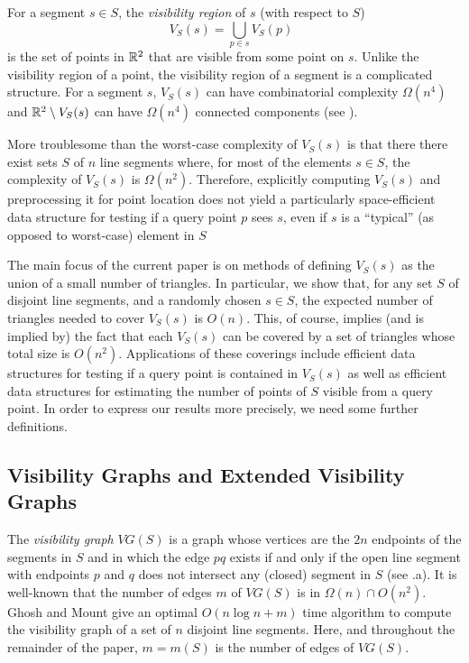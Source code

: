 \documentclass{patmorin}
\newcommand{\VG}{\mathit{VG}}
\begin{document}
For a segment $s\in S$, the \emph{visibility region} of $s$ (with respect
to $S$)
\[
   V_S(s)=\bigcup_{p\in s} V_S(p) \enspace 
\]
is the set of points in $\mathbb{R}^2$ that are visible from some point on $s$.
Unlike the visibility region of a point, the visibility region of a
segment is a complicated structure.  For a segment $s$, $V_S(s)$ can have
combinatorial complexity $\Omega(n^4)$ and $\mathbb{R}^2\setminus V_S(s)$ can
have $\Omega(n^4)$ connected components \cite{oXX} (see ).

More troublesome than the worst-case complexity of $V_S(s)$ is that
there there exist sets $S$ of $n$ line segments where, for most of
the elements $s\in S$, the complexity of $V_S(s)$ is $\Omega(n^2)$.
Therefore, explicitly computing $V_S(s)$ and preprocessing it for point
location does not yield a particularly space-efficient data structure
for testing if a query point $p$ sees $s$, even if $s$ is a ``typical''
(as opposed to worst-case) element in $S$

The main focus of the current paper is on methods of defining $V_S(s)$ as
the union of a small number of triangles.  In particular, we show that,
for any set $S$ of disjoint line segments, and a randomly chosen $s\in
S$, the expected number of triangles needed to cover $V_S(s)$ is $O(n)$.
This, of course, implies (and is implied by) the fact that each $V_S(s)$
can be covered by a set of triangles whose total size is $O(n^2)$.
Applications of these coverings include efficient data structures for
testing if a query point is contained in $V_S(s)$ as well as efficient
data structures for estimating the number of points of $S$ visible from
a query point.  In order to express our results more precisely, we need
some further definitions.

\subsection{Visibility Graphs and Extended Visibility Graphs}

The \emph{visibility graph} $\VG(S)$ is a graph whose vertices are the
$2n$ endpoints of the segments in $S$ and in which the edge $pq$ exists
if and only if the open line segment with endpoints $p$ and $q$ does
not intersect any (closed) segment in $S$ (see .a).  It is
well-known that the number of edges $m$ of $\VG(S)$ is in $\Omega(n)\cap
O(n^2)$.  Ghosh and Mount \cite{gmXX} give an optimal $O(n\log n+ m)$
time algorithm to compute the visibility graph of a set of $n$ disjoint
line segments.  Here, and throughout the remainder of the paper, $m=m(S)$
is the number of edges of $\VG(S)$.
\end{document}
